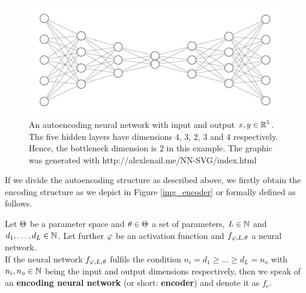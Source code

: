 \begin{figure}
\begin{center}
   \begin{minipage}[b]{0.9\linewidth}
      \includegraphics[width=\linewidth]{autoencoder}
      \caption{An autoencoding neural network with input and output $x, y\in \operatorname{\mathbb{R}}^5$. The five hidden layers have dimensions $4$, $3$, $2$, $3$ and $4$ respectively. Hence, the bottleneck dimension is $2$ in this example. The graphic was generated with http://alexlenail.me/NN-SVG/index.html}\label{fig:autoencoder}
	\end{minipage}
\end{center}
\end{figure}


If we divide the autoencoding structure as described above, we firstly obtain the encoding structure as we depict in Figure \ref{img_encoder} or formally defined as follows.

\begin{definition}\label{def_encoder}
Let $\operatorname{\Theta}$ be a parameter space and $\theta \in \operatorname{\Theta}$ a set of parameters, $L\in \operatorname{\mathbb{N}}$ and $d_1,\ldots, d_L\in\operatorname{\mathbb{N}}$. Let further $\operatorname{\varphi}$ be an activation function and $f_{\operatorname{\varphi},L,\theta}$ a neural network.\\
If the neural network $f_{\operatorname{\varphi},L,\theta}$ fulfils the condition $n_i= d_1 \geq \ldots \geq d_L = n_o$ with $n_i, n_o \in \operatorname{\mathbb{N}}$ being the input and output dimensions respectively, then we speak of an \textbf{encoding neural network} (or short: \textbf{encoder}) and denote it as $f_e$.
\end{definition}


